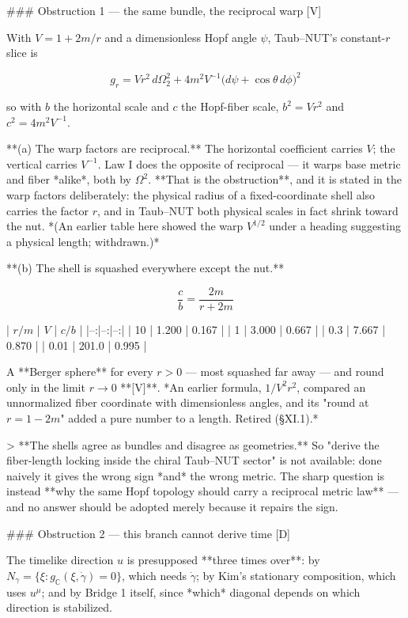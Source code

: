 ### Obstruction 1 — the same bundle, the reciprocal warp [V]

With $V = 1+2m/r$ and a dimensionless Hopf angle $\psi$, Taub–NUT's constant-$r$ slice is

$$g_r = Vr^2\,d\Omega_2^2 + 4m^2V^{-1}\big(d\psi+\cos\theta\,d\phi\big)^2$$

so with $b$ the horizontal scale and $c$ the Hopf-fiber scale, $b^2 = Vr^2$ and $c^2 = 4m^2V^{-1}$.

**(a) The warp factors are reciprocal.** The horizontal coefficient carries $V$; the vertical carries $V^{-1}$. Law I does the opposite of reciprocal — it warps base metric and fiber *alike*, both by $\Omega^2$. **That is the obstruction**, and it is stated in the warp factors deliberately: the physical radius of a fixed-coordinate shell also carries the factor $r$, and in Taub–NUT both physical scales in fact shrink toward the nut. *(An earlier table here showed the warp $V^{1/2}$ under a heading suggesting a physical length; withdrawn.)*

**(b) The shell is squashed everywhere except the nut.**

$$\frac cb = \frac{2m}{r+2m}$$

| $r/m$ | $V$ | $c/b$ |
|--:|--:|--:|
| 10 | 1.200 | 0.167 |
| 1 | 3.000 | 0.667 |
| 0.3 | 7.667 | 0.870 |
| 0.01 | 201.0 | 0.995 |

A **Berger sphere** for every $r>0$ — most squashed far away — and round only in the limit $r\to0$ **[V]**. *An earlier formula, $1/V^2r^2$, compared an unnormalized fiber coordinate with dimensionless angles, and its "round at $r = 1-2m$" added a pure number to a length. Retired (§XI.1).*

> **The shells agree as bundles and disagree as geometries.** So "derive the fiber-length locking inside the chiral Taub–NUT sector" is not available: done naively it gives the wrong sign *and* the wrong metric. The sharp question is instead **why the same Hopf topology should carry a reciprocal metric law** — and no answer should be adopted merely because it repairs the sign.

### Obstruction 2 — this branch cannot derive time [D]

The timelike direction $u$ is presupposed **three times over**: by $N_\gamma = \{\xi:g_\mathbb{C}(\xi,\dot\gamma) = 0\}$, which needs $\dot\gamma$; by Kim's stationary composition, which uses $u^\mu$; and by Bridge 1 itself, since *which* diagonal depends on which direction is stabilized.

